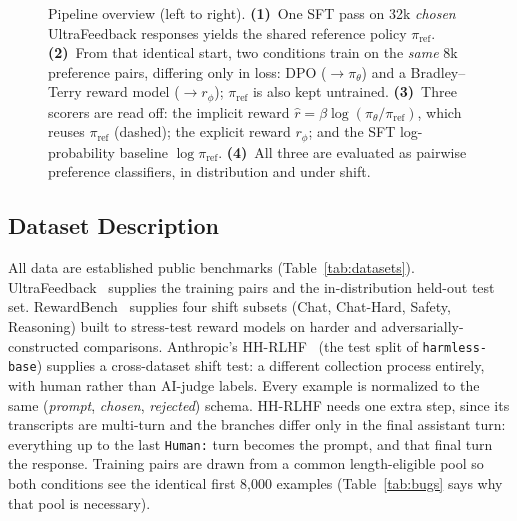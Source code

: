 \documentclass[11pt]{article}
\begin{document}
\begin{figure}[H]
{}
\caption{Pipeline overview (left to right). \textbf{(1)}~One SFT pass on 32k \emph{chosen}
UltraFeedback responses yields the shared reference policy $\pi_{\mathrm{ref}}$. \textbf{(2)}~From
that identical start, two conditions train on the \emph{same} 8k preference pairs, differing only
in loss: DPO ($\to\pi_\theta$) and a Bradley--Terry reward model ($\to r_\phi$); $\pi_{
\mathrm{ref}}$ is also kept untrained. \textbf{(3)}~Three scorers are read off: the implicit
reward $\hat r=\beta\log(\pi_\theta/\pi_{\mathrm{ref}})$, which reuses $\pi_{\mathrm{ref}}$
(dashed); the explicit reward $r_\phi$; and the SFT log-probability baseline $\log\pi_{\mathrm{
ref}}$. \textbf{(4)}~All three are evaluated as pairwise preference classifiers, in distribution
and under shift.}
\label{fig:pipeline}
\end{figure}

\subsection{Dataset Description}
\label{sec:dataset}
All data are established public benchmarks (Table~\ref{tab:datasets}).
UltraFeedback~\cite{cui2023ultrafeedback} supplies the training pairs and the in-distribution
held-out test set. RewardBench~\cite{lambert2024rewardbench} supplies four shift subsets
(Chat, Chat-Hard, Safety, Reasoning) built to stress-test reward models on harder and
adversarially-constructed comparisons. Anthropic's HH-RLHF~\cite{bai2022hh} (the test split of
\texttt{harmless-base}) supplies a cross-dataset shift test: a different collection process
entirely, with human rather than AI-judge labels. Every example is normalized to the same
(\emph{prompt}, \emph{chosen}, \emph{rejected}) schema. HH-RLHF needs one extra step, since its
transcripts are multi-turn and the branches differ only in the final assistant turn: everything
up to the last \texttt{Human:} turn becomes the prompt, and that final turn the response.
Training pairs are drawn from a common length-eligible pool so both conditions see the identical
first 8,000 examples (Table~\ref{tab:bugs} says why that pool is necessary).
\end{document}
